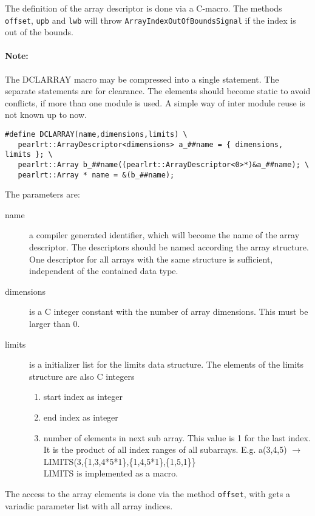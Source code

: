 The definition of the array descriptor is done via a C-macro.
The methods \verb|offset|, \verb|upb| and \verb|lwb| 
will throw \verb|ArrayIndexOutOfBoundsSignal|
if the index is out of the bounds.

\paragraph{Note:} The DCLARRAY macro may be compressed into a single statement.
The separate statements are for clearance.
The elements should become static to avoid conflicts, if more than 
one module is used. A simple way of inter module reuse is not known up to now.

\begin{verbatim}
#define DCLARRAY(name,dimensions,limits) \
   pearlrt::ArrayDescriptor<dimensions> a_##name = { dimensions, limits }; \
   pearlrt::Array b_##name((pearlrt::ArrayDescriptor<0>*)&a_##name); \
   pearlrt::Array * name = &(b_##name);
\end{verbatim}

The parameters are:
\begin{description}
\item[name] a compiler generated identifier, which will become
    the name  of the array descriptor. The descriptors should be 
    named according the array structure. One descriptor for all
    arrays with the same structure is sufficient, independent of
    the contained data type.
\item [dimensions] is a C integer constant with the number of 
   array dimensions. This must be larger than 0.
\item[limits] is a initializer list for the limits data structure.
   The elements of the limits structure are also C integers
   \begin{enumerate}
   \item start index as integer
   \item end index as integer
   \item number of elements in next sub array. This value is 1 for the 
     last index. It is the product of all index ranges of all subarrays.
     E.g. a(3,4,5) $\rightarrow$ LIMITS(3,\{1,3,4*5*1\},\{1,4,5*1\},\{1,5,1\}\}
     \\
     LIMITS is implemented as a macro.
   \end{enumerate}
\end{description}

The access to the array elements is done via the method \verb|offset|, 
with gets a variadic parameter list with all array indices.

